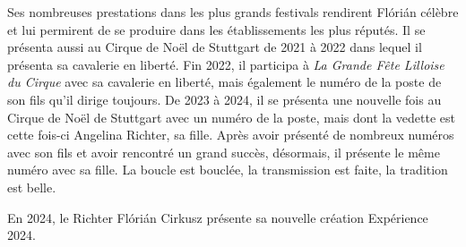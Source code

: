 Ses nombreuses prestations dans les plus grands festivals rendirent Flórián célèbre et lui permirent de se produire dans les établissements les plus réputés. Il se présenta aussi au Cirque de Noël de Stuttgart de 2021 à 2022 dans lequel il présenta sa cavalerie en liberté. Fin 2022, il participa à \textit{La Grande Fête Lilloise du Cirque} avec sa cavalerie en liberté, mais également le numéro de la poste de son fils qu’il dirige toujours. De 2023 à 2024, il se présenta une nouvelle fois au Cirque de Noël de Stuttgart avec un numéro de la poste, mais dont la vedette est cette fois-ci Angelina Richter, sa fille. Après avoir présenté de nombreux numéros avec son fils et avoir rencontré un grand succès, désormais, il présente le même numéro avec sa fille. La boucle est bouclée, la transmission est faite, la tradition est belle. 

En 2024, le Richter Flórián Cirkusz présente sa nouvelle création Expérience 2024. 




\thispagestyle{empty} %

